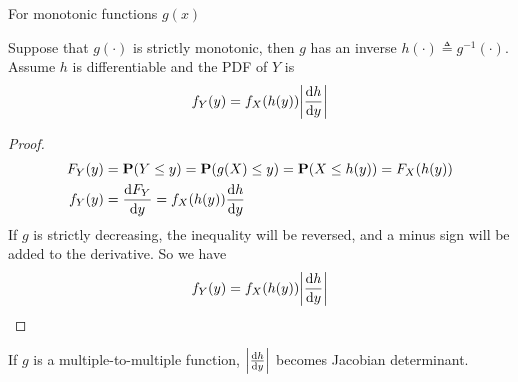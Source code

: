 For monotonic functions $g(x)$
\begin{theorem}
    Suppose that $g(\cdot)$ is strictly monotonic, then $g$ has an inverse $h(\cdot) \triangleq g^{-1}(\cdot)$. Assume $h$ is differentiable and the PDF of $Y$ is
    \begin{equation}
        f_{Y}(y) = f_{X}(h(y)) \abs{\dv{h}{y}}
    \end{equation}
\end{theorem}
\begin{proof}
    \begin{align}
        F_{Y}(y) &= \mathbf{P}(Y \leq y) = \mathbf{P}(g(X) \leq y) = \mathbf{P}(X \leq h(y)) = F_{X}(h(y)) \\ 
        f_{Y}(y) &= \dv{F_{Y}}{y} = f_{X}(h(y)) \dv{h}{y}
    \end{align}
    If $g$ is strictly decreasing, the inequality will be reversed, and a minus sign will be added to the derivative. So we have
    \begin{equation}
        f_{Y}(y) = f_{X}(h(y)) \abs{\dv{h}{y}}
    \end{equation}
\end{proof}
\begin{remark}
    If $g$ is a multiple-to-multiple function, $\abs{\dv{h}{y}}$ becomes Jacobian determinant.
\end{remark}

